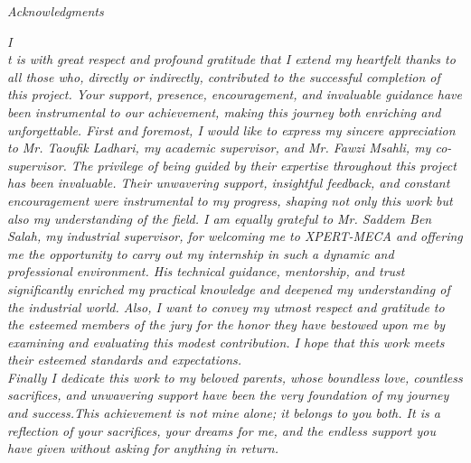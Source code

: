 \centerline{\emph{\LARGE{Acknowledgments }}}

\vspace*{1cm}
\emph{
\lettrine[lines=2]{I}\\t is with great respect and profound gratitude that I extend my heartfelt thanks to all those who, directly or indirectly, contributed to the successful completion of this project. Your support, presence, encouragement, and invaluable guidance have been instrumental to our achievement, making this journey both enriching and unforgettable.
\newline \newline \indent First and foremost, I would like to express my sincere appreciation to Mr. Taoufik Ladhari, my academic supervisor, and Mr. Fawzi Msahli, my co-supervisor. The privilege of being guided by their expertise throughout this project has been invaluable. Their unwavering support, insightful feedback, and constant encouragement were instrumental to my progress, shaping not only this work but also my understanding of the field.
\newline \newline \indent I am equally grateful to Mr. Saddem Ben Salah, my industrial supervisor, for welcoming me to XPERT-MECA and offering me the opportunity to carry out my internship in such a dynamic and professional environment. His technical guidance, mentorship, and trust significantly enriched my practical knowledge and deepened my understanding of the industrial world. 
\newline \newline \indent Also, I want to convey my utmost respect and gratitude to the esteemed members of the jury for the honor they have bestowed upon me by examining and evaluating this modest contribution. I hope that this work meets their esteemed standards and expectations. \\
\newline  \newline \indent Finally I dedicate this work to my beloved parents, whose boundless love, countless sacrifices, and unwavering support have been the very foundation of my journey and success.This achievement is not mine alone; it belongs to you both. It is a reflection of your sacrifices, your dreams for me, and the endless support you have given without asking for anything in return.}
